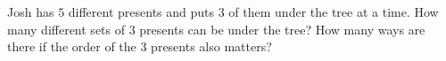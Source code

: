 Josh has $5$ different presents and puts $3$ of them under the tree at a time. How many different sets of $3$ presents can be under the tree? How many ways are there if the order of the $3$ presents also matters?
